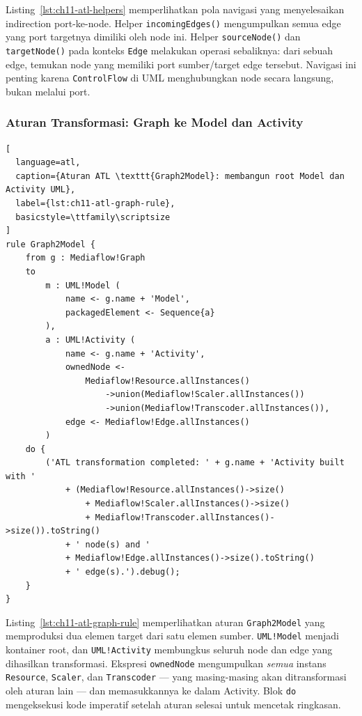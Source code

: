 \noindent Listing~\ref{lst:ch11-atl-helpers} memperlihatkan pola navigasi yang menyelesaikan indirection port-ke-node. Helper \texttt{incomingEdges()} mengumpulkan semua edge yang port targetnya dimiliki oleh node ini. Helper \texttt{sourceNode()} dan \texttt{targetNode()} pada konteks \texttt{Edge} melakukan operasi sebaliknya: dari sebuah edge, temukan node yang memiliki port sumber/target edge tersebut. Navigasi ini penting karena \texttt{ControlFlow} di UML menghubungkan node secara langsung, bukan melalui port.

\subsubsection{Aturan Transformasi: Graph ke Model dan Activity}

\begin{lstlisting}[
  language=atl,
  caption={Aturan ATL \texttt{Graph2Model}: membangun root Model dan Activity UML},
  label={lst:ch11-atl-graph-rule},
  basicstyle=\ttfamily\scriptsize
]
rule Graph2Model {
    from g : Mediaflow!Graph
    to
        m : UML!Model (
            name <- g.name + 'Model',
            packagedElement <- Sequence{a}
        ),
        a : UML!Activity (
            name <- g.name + 'Activity',
            ownedNode <-
                Mediaflow!Resource.allInstances()
                    ->union(Mediaflow!Scaler.allInstances())
                    ->union(Mediaflow!Transcoder.allInstances()),
            edge <- Mediaflow!Edge.allInstances()
        )
    do {
        ('ATL transformation completed: ' + g.name + 'Activity built with '
            + (Mediaflow!Resource.allInstances()->size()
                + Mediaflow!Scaler.allInstances()->size()
                + Mediaflow!Transcoder.allInstances()->size()).toString()
            + ' node(s) and '
            + Mediaflow!Edge.allInstances()->size().toString()
            + ' edge(s).').debug();
    }
}
\end{lstlisting}

\noindent Listing~\ref{lst:ch11-atl-graph-rule} memperlihatkan aturan \texttt{Graph2Model} yang memproduksi dua elemen target dari satu elemen sumber. \texttt{UML!Model} menjadi kontainer root, dan \texttt{UML!Activity} membungkus seluruh node dan edge yang dihasilkan transformasi. Ekspresi \texttt{ownedNode} mengumpulkan \textit{semua} instans \texttt{Resource}, \texttt{Scaler}, dan \texttt{Transcoder} --- yang masing-masing akan ditransformasi oleh aturan lain --- dan memasukkannya ke dalam Activity. Blok \texttt{do} mengeksekusi kode imperatif setelah aturan selesai untuk mencetak ringkasan.


